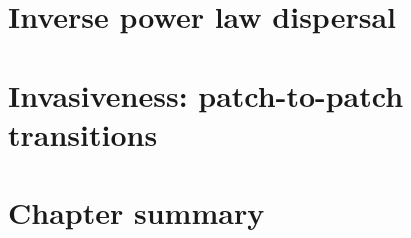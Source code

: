 

\section{Inverse power law dispersal}


\blindtext 

\blindtext


\section{Invasiveness: patch-to-patch transitions}

\blindtext

\blindtext

\blindtext

\section{Chapter summary}

\blindtext

\blindtext
